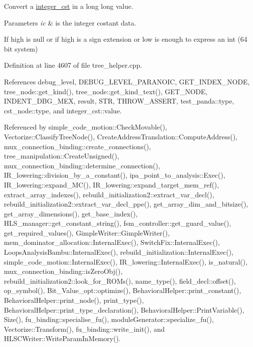 Convert a \hyperlink{structinteger__cst}{integer\+\_\+cst} in a long long value. 


\begin{DoxyParams}{Parameters}
{\em ic} & is the integer costant data. \\
\hline
\end{DoxyParams}
If high is null or if high is a sign extension or low is enough to express an int (64 bit system) 

Definition at line 4607 of file tree\+\_\+helper.\+cpp.



References debug\+\_\+level, D\+E\+B\+U\+G\+\_\+\+L\+E\+V\+E\+L\+\_\+\+P\+A\+R\+A\+N\+O\+IC, G\+E\+T\+\_\+\+I\+N\+D\+E\+X\+\_\+\+N\+O\+DE, tree\+\_\+node\+::get\+\_\+kind(), tree\+\_\+node\+::get\+\_\+kind\+\_\+text(), G\+E\+T\+\_\+\+N\+O\+DE, I\+N\+D\+E\+N\+T\+\_\+\+D\+B\+G\+\_\+\+M\+EX, result, S\+TR, T\+H\+R\+O\+W\+\_\+\+A\+S\+S\+E\+RT, test\+\_\+panda\+::type, cst\+\_\+node\+::type, and integer\+\_\+cst\+::value.



Referenced by simple\+\_\+code\+\_\+motion\+::\+Check\+Movable(), Vectorize\+::\+Classify\+Tree\+Node(), Create\+Address\+Translation\+::\+Compute\+Address(), mux\+\_\+connection\+\_\+binding\+::create\+\_\+connections(), tree\+\_\+manipulation\+::\+Create\+Unsigned(), mux\+\_\+connection\+\_\+binding\+::determine\+\_\+connection(), I\+R\+\_\+lowering\+::division\+\_\+by\+\_\+a\+\_\+constant(), ipa\+\_\+point\+\_\+to\+\_\+analysis\+::\+Exec(), I\+R\+\_\+lowering\+::expand\+\_\+\+M\+C(), I\+R\+\_\+lowering\+::expand\+\_\+target\+\_\+mem\+\_\+ref(), extract\+\_\+array\+\_\+indexes(), rebuild\+\_\+initialization2\+::extract\+\_\+var\+\_\+decl(), rebuild\+\_\+initialization2\+::extract\+\_\+var\+\_\+decl\+\_\+ppe(), get\+\_\+array\+\_\+dim\+\_\+and\+\_\+bitsize(), get\+\_\+array\+\_\+dimensions(), get\+\_\+base\+\_\+index(), H\+L\+S\+\_\+manager\+::get\+\_\+constant\+\_\+string(), fsm\+\_\+controller\+::get\+\_\+guard\+\_\+value(), get\+\_\+required\+\_\+values(), Gimple\+Writer\+::\+Gimple\+Writer(), mem\+\_\+dominator\+\_\+allocation\+::\+Internal\+Exec(), Switch\+Fix\+::\+Internal\+Exec(), Loops\+Analysis\+Bambu\+::\+Internal\+Exec(), rebuild\+\_\+initialization\+::\+Internal\+Exec(), simple\+\_\+code\+\_\+motion\+::\+Internal\+Exec(), I\+R\+\_\+lowering\+::\+Internal\+Exec(), is\+\_\+natural(), mux\+\_\+connection\+\_\+binding\+::is\+Zero\+Obj(), rebuild\+\_\+initialization2\+::look\+\_\+for\+\_\+\+R\+O\+Ms(), name\+\_\+type(), field\+\_\+decl\+::offset(), op\+\_\+symbol(), Bit\+\_\+\+Value\+\_\+opt\+::optimize(), Behavioral\+Helper\+::print\+\_\+constant(), Behavioral\+Helper\+::print\+\_\+node(), print\+\_\+type(), Behavioral\+Helper\+::print\+\_\+type\+\_\+declaration(), Behavioral\+Helper\+::\+Print\+Variable(), Size(), fu\+\_\+binding\+::specialise\+\_\+fu(), module\+Generator\+::specialize\+\_\+fu(), Vectorize\+::\+Transform(), fu\+\_\+binding\+::write\+\_\+init(), and H\+L\+S\+C\+Writer\+::\+Write\+Param\+In\+Memory().

